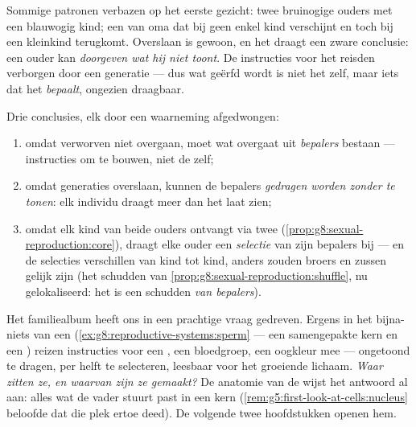 \begin{example}\label{ex:g9:heredity-and-traits:skip}
Sommige patronen verbazen op het eerste gezicht: twee
bruinogige ouders met een blauwogig kind; een  van oma
dat bij geen enkel kind verschijnt en toch bij een kleinkind
terugkomt. Overslaan is gewoon, en het draagt een zware
conclusie: een ouder kan \emph{doorgeven wat hij niet toont}.
De instructies voor het  reisden verborgen door een
generatie --- dus wat geërfd wordt is niet het  zelf,
maar iets dat het \emph{bepaalt}, ongezien draagbaar.
\end{example}

\begin{proposition}\label{prop:g9:heredity-and-traits:conclusions}
Drie conclusies, elk door een waarneming afgedwongen:
\begin{enumerate}
  \item omdat verworven  niet overgaan, moet wat
        overgaat uit \emph{bepalers} bestaan --- instructies
        om  te bouwen, niet de  zelf;
  \item omdat  generaties overslaan, kunnen de
        bepalers \emph{gedragen worden zonder te tonen}: elk
        individu draagt meer dan het laat zien;
  \item omdat elk kind van beide ouders ontvangt via twee
        (\cref{prop:g8:sexual-reproduction:core}), draagt elke
        ouder een \emph{selectie} van zijn bepalers bij --- en
        de selecties verschillen van kind tot kind, anders
        zouden broers en zussen gelijk zijn
        (het schudden van
        \cref{prop:g8:sexual-reproduction:shuffle}, nu
        gelokaliseerd: het is een schudden \emph{van bepalers}).
\end{enumerate}
\end{proposition}
\admitted

\begin{remark}\label{rem:g9:heredity-and-traits:question}
Het familiealbum heeft ons in een prachtige vraag gedreven.
Ergens in het bijna-niets van een 
(\cref{ex:g8:reproductive-systems:sperm} --- een
samengepakte kern en een ) reizen instructies voor een
, een bloedgroep, een oogkleur mee --- ongetoond te
dragen, per helft te selecteren, leesbaar voor het groeiende
lichaam. \emph{Waar zitten ze, en waarvan zijn ze gemaakt?}
De anatomie van de  wijst het antwoord al aan: alles
wat de vader stuurt past in een kern
(\cref{rem:g5:first-look-at-cells:nucleus} beloofde dat die
plek ertoe deed). De volgende twee hoofdstukken openen hem.
\end{remark}

